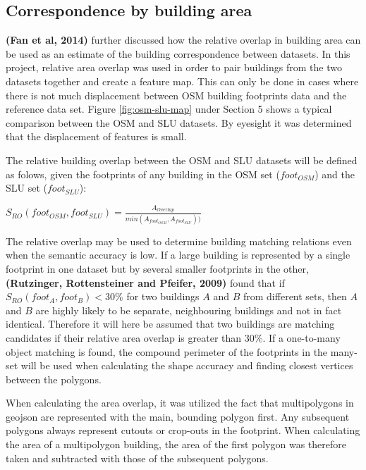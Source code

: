 \documentclass{kththesis}
\begin{document}
\subsection{Correspondence by building area}

\textbf{(Fan et al, 2014)} further discussed how the relative overlap in building area can be used as an estimate of the building correspondence between datasets.
In this project, relative area overlap was used in order to pair buildings from the two datasets together and create a feature map.
This can only be done in cases where there is not much displacement between OSM building footprints data and the reference data set.
Figure \ref{fig:osm-slu-map} under Section 5 shows a typical comparison between the OSM and SLU datasets.
By eyesight it was determined that the displacement of features is small.

The relative building overlap between the OSM and SLU datasets will be defined as folows, given the footprints of any building in the OSM set ($foot_{OSM}$) and the SLU set ($foot_{SLU}$):
\begin{center}
    $S_{RO}(foot_{OSM}, foot_{SLU}) = \frac{A_{Overlap}}{min(A_{foot_{OSM}}, A_{foot_{SLU}}))}$
\end{center}

The relative overlap may be used to determine building matching relations even when the semantic accuracy is low.
If a large building is represented by a single footprint in one dataset but by several smaller footprints in the other, \textbf{(Rutzinger, Rottensteiner and Pfeifer, 2009)} found that if $S_{RO}(foot_{A}, foot_{B}) < 30\%$ for two buildings $A$ and $B$ from different sets, then $A$ and $B$ are highly likely to be separate, neighbouring buildings and not in fact identical.
Therefore it will here be assumed that two buildings are matching candidates if their relative area overlap is greater than 30\%.
If a one-to-many object matching is found, the compound perimeter of the footprints in the many-set will be used when calculating the shape accuracy and finding closest vertices between the polygons.

When calculating the area overlap, it was utilized the fact that multipolygons in geojson are represented with the main, bounding polygon first.
Any subsequent polygons always represent cutouts or crop-outs in the footprint.
When calculating the area of a multipolygon building, the area of the first polygon was therefore taken and subtracted with those of the subsequent polygons.
\end{document}
